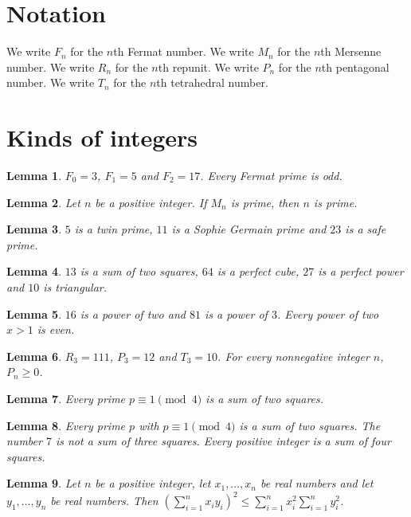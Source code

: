\documentclass{article}
\newtheorem{lemma}{Lemma}
\begin{document}
\section{Notation}

We write $F_n$ for the $n$th Fermat number.
We write $M_n$ for the $n$th Mersenne number.
We write $R_n$ for the $n$th repunit.
We write $P_n$ for the $n$th pentagonal number.
We write $T_n$ for the $n$th tetrahedral number.

\section{Kinds of integers}

\begin{lemma}\label{fermat}
$F_0=3$, $F_1=5$ and $F_2=17$. Every Fermat prime is odd.
\end{lemma}

\begin{lemma}\label{mersenne}
Let $n$ be a positive integer. If $M_n$ is prime, then $n$ is prime.
\end{lemma}

\begin{lemma}\label{twin}
$5$ is a twin prime, $11$ is a Sophie Germain prime and $23$ is a safe prime.
\end{lemma}

\begin{lemma}\label{squares}
$13$ is a sum of two squares, $64$ is a perfect cube, $27$ is a perfect power and $10$ is triangular.
\end{lemma}

\begin{lemma}\label{powers}
$16$ is a power of two and $81$ is a power of $3$. Every power of two $x>1$ is even.
\end{lemma}

\begin{lemma}\label{figurate}
$R_3=111$, $P_3=12$ and $T_3=10$. For every nonnegative integer $n$, $P_n\ge0$.
\end{lemma}

\begin{lemma}\label{fermat-two-squares}
Every prime $p\equiv1\pmod4$ is a sum of two squares.
\end{lemma}

\begin{lemma}\label{sums-of-squares}
Every prime $p$ with $p\equiv1\pmod 4$ is a sum of two squares. The number $7$ is not a sum of three squares. Every positive integer is a sum of four squares.
\end{lemma}

\begin{lemma}\label{cauchy-schwarz}
Let $n$ be a positive integer, let $x_1,\dots,x_n$ be real numbers and let $y_1,\dots,y_n$ be real numbers. Then $\left(\sum_{i=1}^n x_iy_i\right)^2\le\sum_{i=1}^n x_i^2\sum_{i=1}^n y_i^2$.
\end{lemma}
\end{document}
